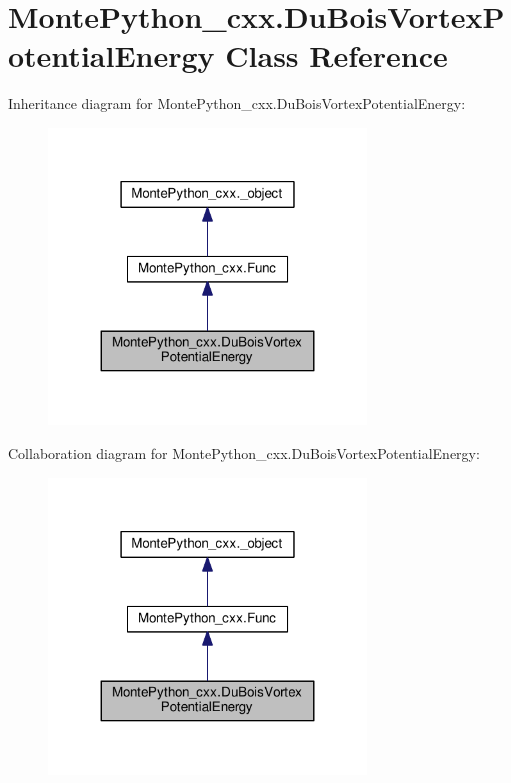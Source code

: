 \hypertarget{classMontePython__cxx_1_1DuBoisVortexPotentialEnergy}{}\section{Monte\+Python\+\_\+cxx.\+Du\+Bois\+Vortex\+Potential\+Energy Class Reference}
\label{classMontePython__cxx_1_1DuBoisVortexPotentialEnergy}


Inheritance diagram for Monte\+Python\+\_\+cxx.\+Du\+Bois\+Vortex\+Potential\+Energy\+:
\nopagebreak
\begin{figure}[H]
\begin{center}
\leavevmode
\includegraphics[width=239pt]{classMontePython__cxx_1_1DuBoisVortexPotentialEnergy__inherit__graph}
\end{center}
\end{figure}


Collaboration diagram for Monte\+Python\+\_\+cxx.\+Du\+Bois\+Vortex\+Potential\+Energy\+:
\nopagebreak
\begin{figure}[H]
\begin{center}
\leavevmode
\includegraphics[width=239pt]{classMontePython__cxx_1_1DuBoisVortexPotentialEnergy__coll__graph}
\end{center}
\end{figure}
